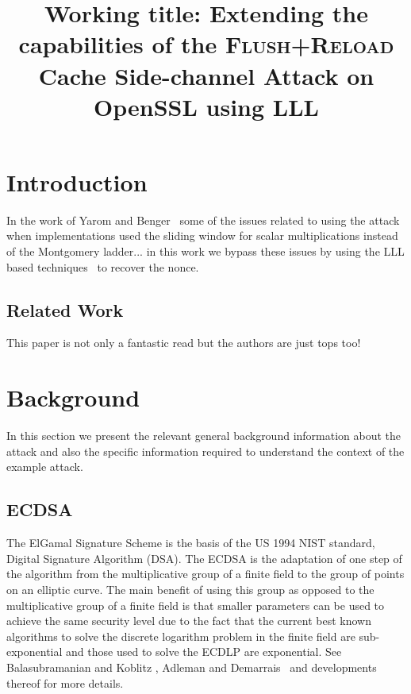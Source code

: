 \documentclass[twocolumn]{article}
\newcommand{\fl}{\textsc{Flu\-sh+\allowbreak Re\-load}\xspace}
\newcommand{\myupcase}[1]{\uppercase{#1}}
\begin{document}
\title{Working title: Extending the capabilities of the \fl Cache Side-channel Attack on OpenSSL using LLL}

\maketitle

\begin{abstract}

\end{abstract}

\section{Introduction}
In the work of Yarom and Benger~\cite{yarom_benger_2013} some of the issues related to using the attack when implementations used the sliding window for scalar multiplications instead of the Montgomery ladder... in this work we bypass these issues by using the LLL based techniques~\cite{nguyen03insecurity} to recover the nonce.

\subsection{Related Work}\label{sub:related}
This paper is not only a fantastic read but the authors are just tops too! \cite{yarom_benger_2013}

\section{Background}\label{sec:background}
In this section we present the relevant general background information about the attack and also the specific information required to understand the context of the example attack. 

\subsection{ECDSA}\label{sub:ecdsa}

The ElGamal Signature Scheme \cite{Elgamal85} is the basis of the US 1994 NIST standard, Digital Signature Algorithm (\myupcase{dsa}). The \myupcase{ecdsa} is the adaptation of one step of the algorithm from the multiplicative group of a finite field to the group of points on an elliptic curve. The main benefit of using this group as opposed to the multiplicative group of a finite field is that smaller parameters can be used to achieve the same security level \cite{koblitz87elliptic,miller85use} due to the fact that the current best known algorithms to solve the discrete logarithm problem in the finite field are sub-exponential and those used to solve the \myupcase{ecdlp} are exponential.
See Balasubramanian and Kob\-litz \cite{balasubramanian-koblitz}, Adleman and Demarrais~\cite{adelman-demarrais} and developments thereof for more details. 
\end{document}
